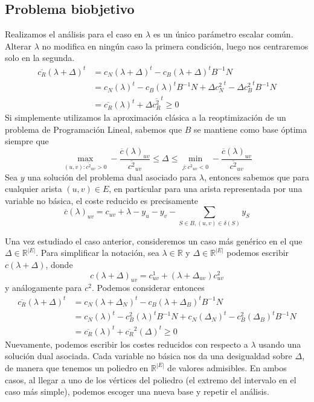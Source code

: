 \documentclass[twoside,a4paper,openright,12pt,tikz]{book}
\newcommand{\R}{\mathbb{R}}
\begin{document}
\subsection{Problema biobjetivo}
Realizamos el análisis para el caso en $\lambda$ es un único parámetro escalar común. Alterar $\lambda$ no modifica en ningún caso la primera condición, luego nos centraremos solo en la segunda. 
\begin{align*}
\overline{c_R}(\lambda+\Delta)^t&= c_N(\lambda + \Delta)^t  - c_B(\lambda + \Delta)^t B^{-1}N \\
& = c_N(\lambda)^t  - c_B(\lambda)^t B^{-1}N + \Delta {c_N^2}^t  - \Delta {c_B^2}^t B^{-1}N \\
&= \overline{c_R}(\lambda)^t + \Delta \overline{c_R^2}^t \geq 0
\end{align*}
Si simplemente utilizamos la aproximación clásica a la reoptimización de un problema de Programación Lineal, sabemos que $B$ se mantiene como base óptima siempre que
$$
\max_{(u,v):\overline{c^2}_{uv}>0} -\frac{\overline{c}(\lambda)_{uv}}{\overline{c^2}_{uv}} \leq \Delta \leq \min_{j:\overline{c^2}_{uv}<0} - \frac{\overline{c}(\lambda)_{uv}}{\overline{c^2}_{uv}}
$$
Sea $y$ una solución del problema dual asociado para $\lambda$, entonces sabemos que para cualquier arista $(u,v)\in E$, en particular para una arista representada por una variable no básica, el coste reducido es precisamente 
$$
\overline{c}(\lambda)_{uv} =c_{uv}+\lambda-y_u-y_v - \sum_{S\in B, (u,v)\in \delta(S)}y_S
$$

Una vez estudiado el caso anterior, consideremos un caso más genérico en el que $\Delta \in \R^{|E|}$. Para simplificar la notación, sea $\lambda \in \R$ y $\Delta \in \R^{|E|}$ podemos escribir $c(\lambda+\Delta)$, donde
$$
c(\lambda+\Delta)_{uv} = c^1_{uv}+(\lambda+\Delta_{uv})c^2_{uv}
$$
y análogamente para $c^2$. Podemos considerar entonces
\begin{align*}
\overline{c_R}(\lambda+\Delta)^t&= c_N(\lambda + \Delta_N)^t  - c_B(\lambda + \Delta_B)^t B^{-1}N \\
& = c_N(\lambda)^t  - c_B^2(\lambda)^t B^{-1}N + c_N(\Delta_N)^t  - c_B^2(\Delta_B)^t B^{-1}N \\
&=\overline{c_R}(\lambda)^t + \overline{c_R}^2(\Delta)^t \geq 0
\end{align*}
Nuevamente, podemos escribir los costes reducidos con respecto a $\lambda$ usando una solución dual asociada. Cada variable no básica nos da una desigualdad sobre $\Delta$, de manera que tenemos un poliedro en $\R^{|E|}$ de valores admisibles. En ambos casos, al llegar a uno de los vértices del poliedro (el extremo del intervalo en el caso más simple), podemos escoger una nueva base y repetir el análisis.
\end{document}
